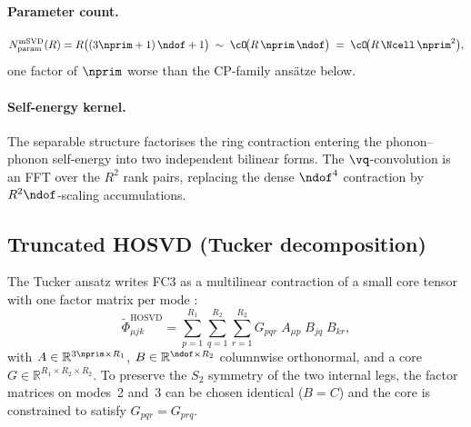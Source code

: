 \paragraph{Parameter count.}
\begin{equation}\label{eq:fc3_matsvd_params}
  N_{\mathrm{param}}^{\mathrm{mSVD}}(R)
  = R\bigl((3\nprim+1)\,\ndof + 1\bigr)
  \;\sim\; \cO\!\bigl(R\,\nprim\,\ndof\bigr)
  \;=\; \cO\!\bigl(R\,\Ncell\,\nprim^{2}\bigr),
\end{equation}
one factor of $\nprim$ worse than the CP-family ans\"atze below.

\paragraph{Self-energy kernel.} The separable structure factorises the ring contraction entering
the phonon--phonon self-energy into two independent bilinear forms. The $\vq$-convolution is an
FFT over the $R^{2}$ rank pairs, replacing the dense $\ndof^{4}$ contraction by
$R^{2}\ndof$-scaling accumulations.

\subsection{Truncated HOSVD (Tucker decomposition)}
\label{sub:fc3_tucker}
The Tucker ansatz writes FC3 as a multilinear contraction of a small core tensor with one factor
matrix per mode \cite{tucker_mathematical_1966, kolda_tensor_2009}:
\begin{equation}\label{eq:fc3_tucker_ansatz}
    \tilde\Phi_{\mu j k}^{\mathrm{HOSVD}}
    = \sum_{p=1}^{R_1}\sum_{q=1}^{R_2}\sum_{r=1}^{R_2}
      G_{p q r}\; A_{\mu p}\; B_{j q}\; B_{k r},
\end{equation}
with $A\in\mathbb{R}^{3\nprim\times R_1}$, $B\in\mathbb{R}^{\ndof\times R_2}$ columnwise
orthonormal, and a core $G\in\mathbb{R}^{R_1\times R_2\times R_2}$. To preserve the $S_2$
symmetry of the two internal legs, the factor matrices on modes~2 and~3 can be chosen identical ($B=C$)
and the core is constrained to satisfy $G_{pqr}=G_{prq}$.

